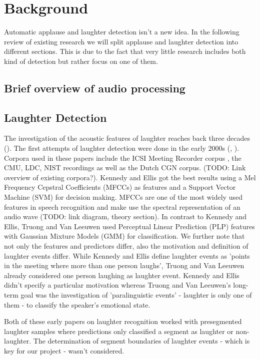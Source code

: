 \documentclass[bsc,frontabs,parskip,deptreport]{infthesis}
\begin{document}
\chapter{Background}
Automatic applause and laughter detection isn't a new idea. In the following review of existing research we will split applause and laughter detection into different sections. This is due to the fact that very little research includes both kind of detection but rather focus on one of them.

\section{Brief overview of audio processing}

\section{Laughter Detection}
The investigation of the acoustic features of laughter reaches back three decades (\cite{bickley1992acoustic}). The first attempts of laughter detection were done in the early 2000s (\cite{kennedy2004laughter}, \cite{truong2005automatic}). Corpora used in these papers include the ICSI Meeting Recorder corpus \cite{morgan2001meeting}, the CMU, LDC, NIST recordings as well as the Dutch CGN corpus. (TODO: Link overview of existing corpora?). Kennedy and Ellis got the best results using a Mel Frequency Cepstral Coefficients (MFCCs) as features and a Support Vector Machine (SVM) for decision making. 
MFCCs are one of the most widely used features in speech recognition and make use the spectral representation of an audio wave (TODO: link diagram, theory section).
In contrast to Kennedy and Ellis, Truong and Van Leeuwen used Perceptual Linear Prediction (PLP) features with Gaussian Mixture Models (GMM) for classification. We further note that not only the features and predictors differ, also the motivation and definition of laughter events differ. While Kennedy and Ellis define laughter events as 'points in the meeting where more than one person laughs', Truong and Van Leeuwen already considered one person laughing as laughter event. Kennedy and Ellis didn't specify a particular motivation whereas Truong and Van Leeuwen's long-term goal was the investigation of 'paralinguistic events' - laughter is only one of them - to classify the speaker's emotional state.   

Both of these early papers on laughter recognition worked with presegmented laughter samples where predictions only classified a segment as laughter or non-laughter. The determination of segment boundaries of laughter events - which is key for our project - wasn't considered. 
\end{document}
